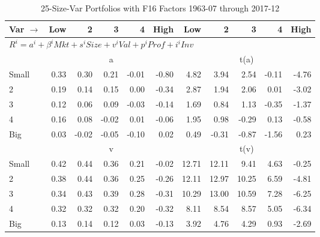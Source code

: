 
\begin{table}[!ht]
\footnotesize
\centering
\caption{25-Size-Var Portfolios with F16 Factors 1963-07 through 2017-12}
\begin{tabular}{lrrrrrrrrrr}
  \toprule
    Var $\rightarrow$ & Low & 2 & 3 & 4 & High & Low & 2 & 3 & 4 & High \\ 
  \midrule
  \multicolumn{11}{l}{$R^i=a^i+\beta^iMkt+s^iSize+v^iVal+p^iProf+i^iInv$} \\

  
    
      & \multicolumn{5}{c}{a} & \multicolumn{5}{c}{t(a)}
    
    \\
      \cmidrule(r){2-6} \cmidrule(r){7-11}

    Small   & 0.33  & 0.30  & 0.21  & -0.01  & -0.80  & 4.82  & 3.94  & 2.54  & -0.11  & -4.76  \\
         2  & 0.19  & 0.14  & 0.15  & 0.00  & -0.34  & 2.87  & 1.94  & 2.06  & 0.01  & -3.02  \\
         3  & 0.12  & 0.06  & 0.09  & -0.03  & -0.14  & 1.69  & 0.84  & 1.13  & -0.35  & -1.37  \\
         4  & 0.16  & 0.08  & -0.02  & 0.01  & -0.06  & 1.95  & 0.98  & -0.29  & 0.13  & -0.58  \\
    Big     & 0.03  & -0.02  & -0.05  & -0.10  & 0.02  & 0.49  & -0.31  & -0.87  & -1.56  & 0.23  \\

  
    
      & \multicolumn{5}{c}{v} & \multicolumn{5}{c}{t(v)}
    
    \\
      \cmidrule(r){2-6} \cmidrule(r){7-11}

    Small   & 0.42  & 0.44  & 0.36  & 0.21  & -0.02  & 12.71  & 12.11  & 9.41  & 4.63  & -0.25  \\
         2  & 0.38  & 0.44  & 0.36  & 0.25  & -0.26  & 12.11  & 12.97  & 10.25  & 6.59  & -4.81  \\
         3  & 0.34  & 0.43  & 0.39  & 0.28  & -0.31  & 10.29  & 13.00  & 10.59  & 7.28  & -6.25  \\
         4  & 0.32  & 0.32  & 0.32  & 0.20  & -0.32  & 8.11  & 8.54  & 8.57  & 5.05  & -6.34  \\
    Big     & 0.13  & 0.14  & 0.12  & 0.03  & -0.13  & 3.92  & 4.76  & 4.29  & 0.93  & -2.69  \\

  
    

\end{tabular}
\end{table}
